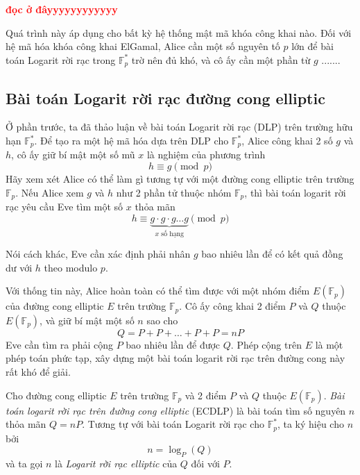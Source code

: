 \textbf{\textcolor{red}{đọc ở đâyyyyyyyyyyyy}}

Quá trình này áp dụng cho bất kỳ hệ thống mật mã khóa công khai nào. Đối với hệ mã hóa khóa công khai ElGamal, Alice cần một số nguyên tố $p$ lớn để bài toán Logarit rời rạc trong $\mathbb{F}^*_p$ trờ nên đủ khó,
và cô ấy cần một phần từ $g$ .......



\subsection{Bài toán Logarit rời rạc đường cong elliptic}
Ở phần trước, ta đã thảo luận về bài toán Logarit rời rạc (DLP) trên trường hữu hạn $\mathbb{F}^*_p$.
Để tạo ra một hệ mã hóa dựa trên DLP cho $\mathbb{F}^*_p$, Alice công khai 2 số $g$ và $h$, cô ấy giữ bí mật một số mũ $x$ là nghiệm của phương trình
$$ h \equiv g \pmod{p} $$
Hãy xem xét Alice có thể làm gì tương tự với một đường cong elliptic trên trường $\mathbb{F}_p$.  Nếu Alice xem $g$ và $h$ như 2 phần tử thuộc nhóm $\mathbb{F}_p$,
thì bài toán logarit rời rạc yêu cầu Eve tìm một số $x$ thỏa mãn
$$ h \equiv \underbrace{ g \cdot g \cdot g \ldots g }_{\text{$x$ số hạng}} \pmod{p} $$

Nói cách khác, Eve cần xác định phải nhân $g$ bao nhiêu lần để có kết quả đồng dư với $h$ theo modulo $p$.

Với thống tin này, Alice hoàn toàn có thể tìm được với một nhóm điểm $E(\mathbb{F}_p)$ của đường cong elliptic $E$ trên trường $\mathbb{F}_p$.
Cô ấy công khai 2 điểm $P$ và $Q$ thuộc $E(\mathbb{F}_p)$, và giữ bí mật một số $n$ sao cho
$$ Q = P+P+ \ldots +P+P = nP$$
Eve cần tìm ra phải cộng $P$ bao nhiêu lần để được $Q$. Phép cộng trên $E$ là một phép toán phức tạp, xây dựng một bài toán logarit rời rạc trên đường cong này rất khó để giải.

\begin{definition}
	Cho đường cong elliptic $E$ trên trường $\mathbb{F}_p$ và 2 điểm $P$ và $Q$ thuộc $E(\mathbb{F}_p)$. \textit{Bài toán logarit rời rạc trên đường cong elliptic} (ECDLP) là bài toán tìm số nguyên $n$ thỏa mãn $Q=nP$.
	Tương tự với bài toán Logarit rời rạc cho $\mathbb{F}^*_p$, ta ký hiệu cho $n$ bởi
	$$  n = \log_P(Q)$$
	và ta gọi $n$ là \textit{Logarit rời rạc elliptic} của $Q$ đối với $P$.
\end{definition}